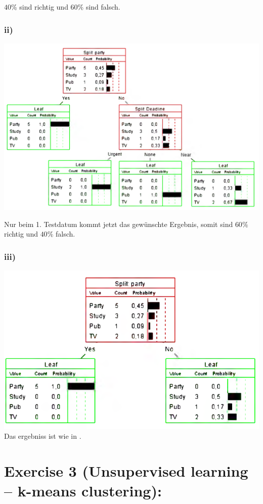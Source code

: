 \documentclass[a4paper,parskip=full-]{article}
\begin{document}
$40\%$ sind richtig und $60\%$ sind falsch.

\subsubsection{ii)}
\label{subsubsec:2d}

\includegraphics[scale=0.9]{2d2}

Nur beim 1. Testdatum kommt jetzt das gewünschte Ergebnis, somit sind $60\%$ richtig und $40\%$ falsch.

\subsubsection{iii)}

\includegraphics[scale=1]{2d3} \\
Das ergebniss ist wie in .

\section{Exercise 3 (Unsupervised learning – k-means clustering):}
\end{document}

